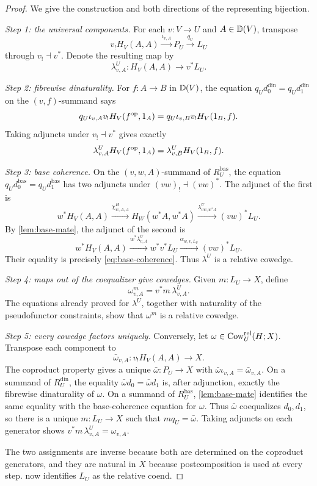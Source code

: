\begin{proof}
We give the construction and both directions of the representing bijection.

\emph{Step 1: the universal components.}
For each \(v:V\to U\) and \(A\in\mathbb{D}(V)\), transpose
\[
  v_!H_V(A,A)\xrightarrow{\iota_{v,A}}P_U
  \xrightarrow{q_U}L_U
\]
through \(v_!\dashv v^*\).  Denote the resulting map by
\begin{equation}
  \lambda^U_{v,A}:H_V(A,A)\longrightarrow v^*L_U.
  \label{eq:coeq-universal-component}
\end{equation}

\emph{Step 2: fibrewise dinaturality.}
For \(f:A\to B\) in \(\mathbb{D}(V)\), the equation
\(q_Ud^{\mathrm{din}}_0=q_Ud^{\mathrm{din}}_1\) on the
\((v,f)\)-summand says
\[
  q_U\iota_{v,A}v_!H_V(f^{\mathrm{op}},1_A)
  =q_U\iota_{v,B}v_!H_V(1_B,f).
\]
Taking adjuncts under \(v_!\dashv v^*\) gives exactly
\[
  \lambda^U_{v,A}H_V(f^{\mathrm{op}},1_A)
  =\lambda^U_{v,B}H_V(1_B,f).
\]

\emph{Step 3: base coherence.}
On the \((v,w,A)\)-summand of \(R_U^{\mathrm{bas}}\), the equation
\(q_Ud^{\mathrm{bas}}_0=q_Ud^{\mathrm{bas}}_1\) has two adjuncts under
\((vw)_!\dashv(vw)^*\).  The adjunct of the first is
\[
  w^*H_V(A,A)\xrightarrow{\chi^H_{w,A,A}}
  H_W(w^*A,w^*A)
  \xrightarrow{\lambda^U_{vw,w^*A}}(vw)^*L_U.
\]
By \cref{lem:base-mate}, the adjunct of the second is
\[
  w^*H_V(A,A)\xrightarrow{w^*\lambda^U_{v,A}}
  w^*v^*L_U\xrightarrow{\alpha_{w,v,L_U}}(vw)^*L_U.
\]
Their equality is precisely \cref{eq:base-coherence}.  Thus
\(\lambda^U\) is a relative cowedge.

\emph{Step 4: maps out of the coequalizer give cowedges.}
Given \(m:L_U\to X\), define
\[
  \omega^m_{v,A}=v^*m\,\lambda^U_{v,A}.
\]
The equations already proved for \(\lambda^U\), together with naturality of
the pseudofunctor constraints, show that \(\omega^m\) is a relative cowedge.

\emph{Step 5: every cowedge factors uniquely.}
Conversely, let \(\omega\in\operatorname{Cow}^{\mathrm{rel}}_U(H;X)\).  Transpose each component to
\[
  \bar\omega_{v,A}:v_!H_V(A,A)\longrightarrow X.
\]
The coproduct property gives a unique
\(\bar\omega:P_U\to X\) with
\(\bar\omega\iota_{v,A}=\bar\omega_{v,A}\).  On a summand of
\(R_U^{\mathrm{din}}\), the equality
\(\bar\omega d_0=\bar\omega d_1\) is, after adjunction, exactly the
fibrewise dinaturality of \(\omega\).  On a summand of
\(R_U^{\mathrm{bas}}\), \cref{lem:base-mate} identifies the same equality
with the base-coherence equation for \(\omega\).  Thus \(\bar\omega\)
coequalizes \(d_0,d_1\), so there is a unique \(m:L_U\to X\) such that
\(mq_U=\bar\omega\).  Taking adjuncts on each generator shows
\(v^*m\,\lambda^U_{v,A}=\omega_{v,A}\).

The two assignments are inverse because both are determined on the coproduct
generators, and they are natural in \(X\) because postcomposition is used at
every step.   now identifies \(L_U\) as the relative
coend.
\end{proof}

